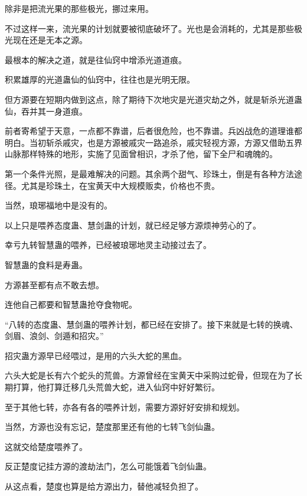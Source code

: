 \begin{this_body}
除非是把流光果的那些极光，挪过来用。

不过这样一来，流光果的计划就要被彻底破坏了。光也是会消耗的，尤其是那些极光现在还是无本之源。

最根本的解决之道，就是往仙窍中增添光道道痕。

积累雄厚的光道蛊仙的仙窍中，往往也是光明无限。

但方源要在短期内做到这点，除了期待下次地灾是光道灾劫之外，就是斩杀光道蛊仙，吞并其一身道痕。

前者寄希望于天意，一点都不靠谱，后者很危险，也不靠谱。兵凶战危的道理谁都明白。当初斩杀戚灾，也是方源被戚灾一路追杀，戚灾轻视方源，方源又借助五界山脉那样特殊的地形，实施了见面曾相识，才杀了他，留下全尸和魂魄的。

第一个条件光照，是最难解决的问题。其余两个甜气、珍珠土，倒是有各种方法途径。尤其是珍珠土，在宝黄天中大规模贩卖，价格也不贵。

当然，琅琊福地中是没有的。

以上只是喂养态度蛊、慧剑蛊的计划，就已经足够方源烦神劳心的了。

幸亏九转智慧蛊的喂养，已经被琅琊地灵主动接过去了。

智慧蛊的食料是寿蛊。

方源甚至都有点不敢去想。

连他自己都要和智慧蛊抢夺食物呢。

“八转的态度蛊、慧剑蛊的喂养计划，都已经在安排了。接下来就是七转的换魂、剑眉、浪剑、剑遁和招灾。”

招灾蛊方源早已经喂过，是用的六头大蛇的黑血。

六头大蛇是长有六个蛇头的荒兽。方源曾经在宝黄天中采购过蛇骨，但现在为了长期打算，他打算迁移几头荒兽大蛇，进入仙窍中好好繁衍。

至于其他七转，亦各有各的喂养计划，需要方源好好安排和规划。

当然，方源也没有忘记，楚度那里还有他的七转飞剑仙蛊。

这就交给楚度喂养了。

反正楚度记挂方源的渡劫法门，怎么可能饿着飞剑仙蛊。

从这点看，楚度也算是给方源出力，替他减轻负担了。

\end{this_body}

